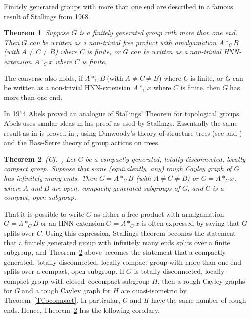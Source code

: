 \documentclass{emsprocart}
\newtheorem{theorem}{Theorem}[section]
\theoremstyle{definition}
\begin{document}
Finitely generated groups with more than one end are described in a 
famous result of Stallings from 1968.

\begin{theorem}{\rm \cite{Stallings1968}}
Suppose $G$ is a finitely generated group with more than one end.
Then $G$ can be written as a non-trivial free product with amalgamation
$A*_CB$ (with $A\neq C\neq
B$)  where $C$ is finite, or $G$ can be written as a non-trivial
HNN-extension $A*_Cx$  where $C$ is finite.
\end{theorem}

The converse also holds, if $A*_CB$ (with $A\neq C\neq
B$)  where $C$ is finite, or $G$ can be written as a non-trivial
HNN-extension $A*_Cx$  where $C$ is finite, then $G$
has more than one end.

In 1974 Abels \cite{Abels1974} proved an analogue of Stallings' Theorem for
topological groups.  Abels uses similar ideas in his proof as used by
Stallings.  Essentially the same result as in \cite{Abels1974} is proved in
\cite{KronMoller2008}, using Dunwoody's theory of structure trees (see
\cite{Dunwoody1982} and \cite{DicksDunwoody1989}) and the Bass-Serre
theory of group actions on trees.

\begin{theorem}\label{TStructertree_infinite}
{\rm (Cf.~\cite{Abels1974})}
Let $G$ be a compactly generated, totally disconnected, locally compact
group.  Suppose that some (equivalently, any) rough Cayley graph of $G$
has infinitely many ends.   Then  $G=A*_C B$ (with $A\neq C\neq
B$) or $G=A*_C x$, where
$A$ and $B$ are open, compactly generated subgroups of $G$, and
$C$ is a compact, open subgroup.
\end{theorem}

That it is possible to write $G$ as either a free product with
amalgamation $G=A*_C B$ or an HNN-extension $G=A*_C x$ is often expressed by
saying that $G$ splits over $C$. Using this expression, Stallings
theorem becomes the statement that a finitely generated group with
infinitely many ends splits over a finite subgroup, and
Theorem~\ref{TStructertree_infinite} above becomes the statement that
a compactly generated, totally disconnected, locally compact group with
more than one end splits over a compact, open subgroup.
If $G$ is  totally disconnected, locally compact group with closed,
cocompact subgroup $H$, then a rough Cayley graphs for $G$
and a rough Cayley graph for  
$H$ are quasi-isometric by Theorem~\ref{TCocompact}. In particular,
$G$ and $H$ have the same number of rough ends. Hence,
Theorem~\ref{TStructertree_infinite} has the following corollary.
\end{document}
